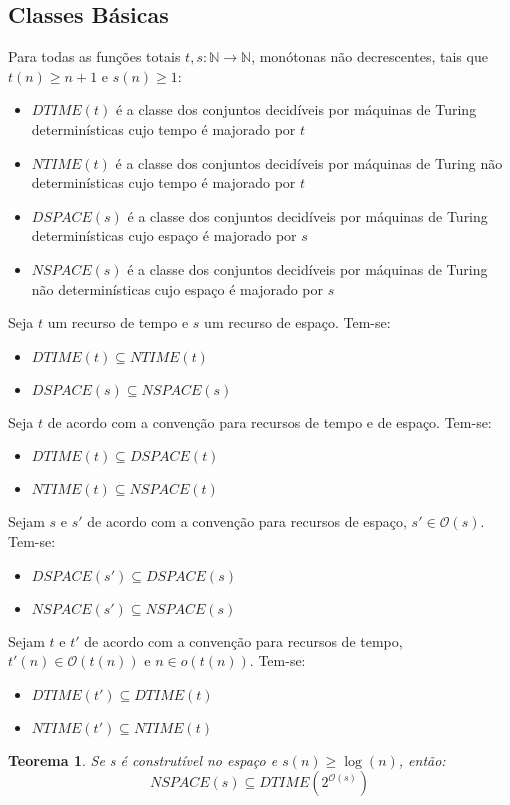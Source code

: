 \documentclass[10pt,a4paper]{report}
\newtheorem{theorem}{Teorema}
\begin{document}
\subsection{Classes Básicas}
Para todas as funções totais $t, s : \mathbb{N} \rightarrow \mathbb{N}$, monótonas não decrescentes, tais que $t(n) \geq n + 1$ e $s(n) \geq 1$:
\begin{itemize}
\item $DTIME(t)$ é a classe dos conjuntos decidíveis por máquinas de Turing determinísticas cujo tempo é majorado por $t$
\item $NTIME(t)$ é a classe dos conjuntos decidíveis por máquinas de Turing não determinísticas cujo tempo é majorado por $t$
\item $DSPACE(s)$ é a classe dos conjuntos decidíveis por máquinas de Turing determinísticas cujo espaço é majorado por $s$
\item $NSPACE(s)$ é a classe dos conjuntos decidíveis por máquinas de Turing não determinísticas cujo espaço é majorado por $s$
\end{itemize}
Seja $t$ um recurso de tempo e $s$ um recurso de espaço. Tem-se:
\begin{itemize}
\item $DTIME(t) \subseteq NTIME(t)$
\item $DSPACE(s) \subseteq NSPACE(s)$
\end{itemize}
Seja $t$ de acordo com a convenção para recursos de tempo e de espaço. Tem-se:
\begin{itemize}
\item $DTIME(t) \subseteq DSPACE(t)$
\item $NTIME(t) \subseteq NSPACE(t)$
\end{itemize}
Sejam $s$ e $s'$ de acordo com a convenção para recursos de espaço, $s' \in \mathcal{O}(s)$. Tem-se:
\begin{itemize}
\item $DSPACE(s') \subseteq DSPACE(s)$
\item $NSPACE(s') \subseteq NSPACE(s)$
\end{itemize}
Sejam $t$ e $t'$ de acordo com a convenção para recursos de tempo, $t'(n) \in \mathcal{O}(t(n))$ e $n \in o(t(n))$. Tem-se:
\begin{itemize}
\item $DTIME(t') \subseteq DTIME(t)$
\item $NTIME(t') \subseteq NTIME(t)$
\end{itemize}
\begin{theorem}
Se s é construtível no espaço e $s(n) \geq \log (n)$, então:
$$
NSPACE(s) \subseteq DTIME(2^{\mathcal{O}(s)})
$$
\end{theorem}
\end{document}
